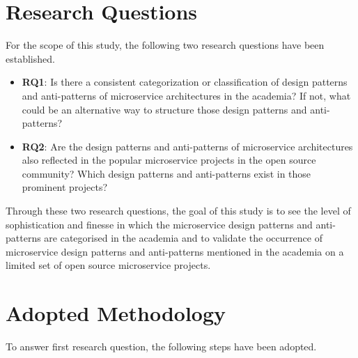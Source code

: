 \documentclass{Configuration_Files/PoliMi3i_thesis}
\begin{document}
\section{Research Questions}
\label{sec:research_questions}

For the scope of this study, the following two research questions have been established.

\begin{itemize}
    \item \textbf{RQ1}: Is there a consistent categorization or classification of design patterns and anti-patterns of microservice architectures in the academia?
    If not, what could be an alternative way to structure those design patterns and anti-patterns?
    
    \item \textbf{RQ2}: Are the design patterns and anti-patterns of microservice architectures also reflected in the popular microservice projects in the open source community?
    Which design patterns and anti-patterns exist in those prominent projects?
\end{itemize}

Through these two research questions, the goal of this study is to see the level of sophistication and finesse in which the microservice design patterns and anti-patterns are categorised in the academia and to validate the occurrence of microservice design patterns and anti-patterns mentioned in the academia on a limited set of open source microservice projects.

\section{Adopted Methodology}
\label{sec:adopted_method}

To answer first research question, the following steps have been adopted.
\end{document}
